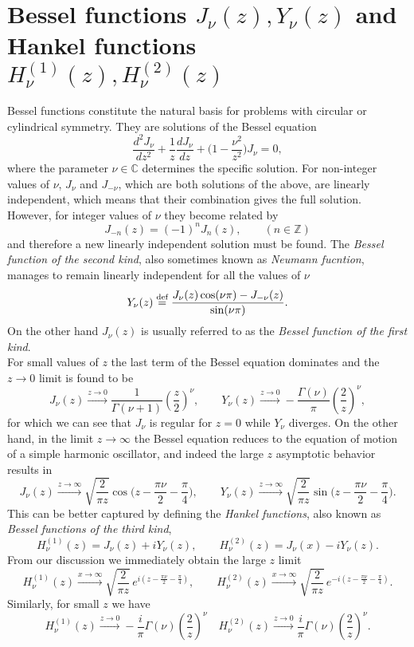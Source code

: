 \section{Bessel functions \(J_\nu(z), Y_\nu(z)\) and Hankel functions $H_\nu^{(1)}(z), H_\nu^{(2)}(z)$}
\label{app:bessel}
Bessel functions constitute the natural basis for problems with circular or cylindrical symmetry. They are solutions of the Bessel equation
\[
\frac{d^2J_\nu}{dz^2}+\frac{1}{z}\frac{dJ_\nu}{dz}+\bigg(1-\frac{\nu^2}{z^2}\bigg)J_\nu=0,
\]
where the parameter $\nu\in\mathbb C$ determines the specific solution. For non-integer values of $\nu$, $J_\nu$ and $J_{-\nu}$, which are both solutions of the above, are linearly independent, which means that their combination gives the full solution. However, for integer values of $\nu$ they become related by 
$$J_{-n}(z)=(-1)^n J_n(z), \qquad (n\in\mathbb Z) $$
and therefore a new linearly independent solution must be found. The \emph{Bessel function of the second kind}, also sometimes known as \emph{Neumann fucntion}, manages to remain linearly independent for all the values of $\nu$
$$Y_\nu(z)\stackrel{\text{def}}{=}\frac{J_\nu(z)\cos(\nu\pi)-J_{-\nu}(z)}{\sin(\nu\pi)}.$$
On the other hand $J_\nu(z)$ is usually referred to as the \emph{Bessel function of the first kind}.\\
For small values of $z$ the last term of the Bessel equation dominates and the $z\to0$ limit is found to be
\[
J_\nu(z)\xrightarrow{z\to0}\frac{1}{\Gamma(\nu+1)}\left(\frac{z}{2}\right)^\nu,\qquad
Y_\nu(z)\xrightarrow{z\to0} -\frac{\Gamma(\nu)}{\pi}\left(\frac{2}{z}\right)^\nu,
\]
for which we can see that $J_\nu$ is regular for $z=0$ while $Y_\nu$ diverges. On the other hand, in the limit $z\to \infty$ the Bessel equation reduces to the equation of motion of a simple harmonic oscillator, and indeed the large $z$ asymptotic behavior results in 
\[
J_\nu(z)\xrightarrow{z\to\infty}\sqrt{\frac{2}{\pi z}}\cos\Big(z-\frac{\pi\nu}{2}-\frac{\pi}{4}\Big),\qquad
Y_\nu(z)\xrightarrow{z\to\infty}\sqrt{\frac{2}{\pi z}}\sin\Big(z-\frac{\pi\nu}{2}-\frac{\pi}{4}\Big).
\]
This can be better captured by defining the \emph{Hankel functions}, also known as \emph{Bessel functions of the third kind},
\[
H^{(1)}_\nu(z)=J_\nu(z)+iY_\nu(z),\qquad H^{(2)}_\nu(z)=J_\nu(x)-iY_\nu(z).
\]
From our discussion we immediately obtain the large $z$ limit
\[
H^{(1)}_\nu(z)\xrightarrow{x\to\infty}\sqrt{\frac{2}{\pi z}}\,e^{i\left(z-\frac{\pi\nu}{2}-\frac{\pi}{4}\right)},
\qquad
H^{(2)}_\nu(z)\xrightarrow{x\to\infty}\sqrt{\frac{2}{\pi z}}\,e^{-i\left(z-\frac{\pi\nu}{2}-\frac{\pi}{4}\right)}.
\]
Similarly, for small $z$ we have
\[
H^{(1)}_\nu(z)\xrightarrow{z\to0} -\frac{i}{\pi}\Gamma(\nu)\left(\frac{2}{z}\right)^\nu
\quad H^{(2)}_\nu(z)\xrightarrow{z\to0} \frac{i}{\pi}\Gamma(\nu)\left(\frac{2}{z}\right)^\nu.
\]

